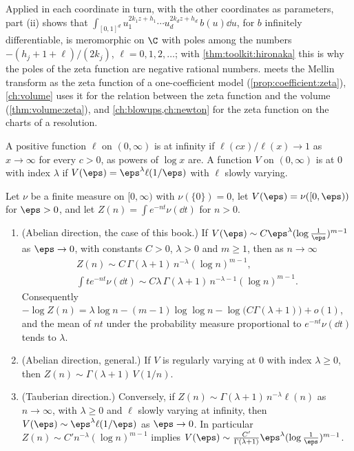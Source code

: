 \begin{refsection}
Applied in each coordinate in turn, with the other coordinates as parameters, part (ii) shows that $\int_{[0,1]^d}u_1^{2k_1z+h_1}\cdots u_d^{2k_dz+h_d}\,b(u)\dd u$, for $b$ infinitely differentiable, is meromorphic on $\C$ with poles among the numbers $-(h_j+1+\ell)/(2k_j)$, $\ell=0,1,2,\dots$; with \cref{thm:toolkit:hironaka} this is why the poles of the zeta function are negative rational numbers.  meets the Mellin transform as the zeta function of a one-coefficient model (\cref{prop:coefficient:zeta}), \cref{ch:volume} uses it for the relation between the zeta function and the volume (\cref{thm:volume:zeta}), and \cref{ch:blowups,ch:newton} for the zeta function on the charts of a resolution.

A positive function $\ell$ on $(0,\infty)$ is  at infinity if $\ell(cx)/\ell(x)\to1$ as $x\to\infty$ for every $c>0$, as powers of $\log x$ are. A function $V$ on $(0,\infty)$ is  at $0$ with index $\lambda$ if $V(\eps)=\eps^\lambda\ell(1/\eps)$ with $\ell$ slowly varying.

\begin{theorem}\label{thm:toolkit:karamata}
Let $\nu$ be a finite measure on $[0,\infty)$ with $\nu(\{0\})=0$, let $V(\eps)=\nu([0,\eps))$ for $\eps>0$, and let $Z(n)=\int e^{-nt}\nu(\dd t)$ for $n>0$.
\begin{enumerate}
\item (Abelian direction, the case of this book.) If $V(\eps)\sim C\eps^\lambda(\log\frac1\eps)^{m-1}$ as $\eps\to0$, with constants $C>0$, $\lambda>0$ and $m\ge1$, then as $n\to\infty$
\begin{gather*}
Z(n)\sim C\,\Gamma(\lambda+1)\,n^{-\lambda}(\log n)^{m-1},\\
\int te^{-nt}\nu(\dd t)\sim C\lambda\,\Gamma(\lambda+1)\,n^{-\lambda-1}(\log n)^{m-1}.
\end{gather*}
Consequently $-\log Z(n)=\lambda\log n-(m-1)\log\log n-\log\bigl(C\Gamma(\lambda+1)\bigr)+o(1)$, and the mean of $nt$ under the probability measure proportional to $e^{-nt}\nu(\dd t)$ tends to $\lambda$.
\item (Abelian direction, general.) If $V$ is regularly varying at $0$ with index $\lambda\ge0$, then $Z(n)\sim\Gamma(\lambda+1)\,V(1/n)$.
\item (Tauberian direction.) Conversely, if $Z(n)\sim\Gamma(\lambda+1)\,n^{-\lambda}\ell(n)$ as $n\to\infty$, with $\lambda\ge0$ and $\ell$ slowly varying at infinity, then $V(\eps)\sim\eps^\lambda\ell(1/\eps)$ as $\eps\to0$. In particular $Z(n)\sim C'n^{-\lambda}(\log n)^{m-1}$ implies $V(\eps)\sim\frac{C'}{\Gamma(\lambda+1)}\eps^\lambda(\log\frac1\eps)^{m-1}$.
\end{enumerate}
\end{theorem}


\end{refsection}
